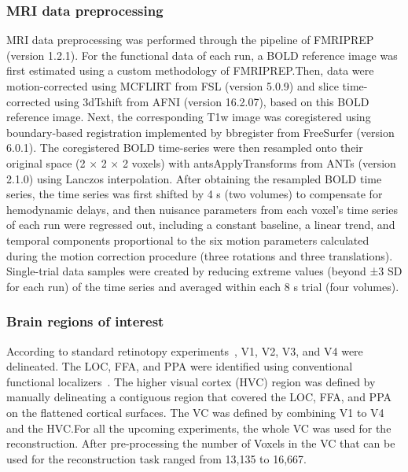 \subsubsection{MRI data preprocessing}
MRI data preprocessing was performed through the pipeline of FMRIPREP (version 1.2.1). For the functional data of each run, a BOLD reference image was first estimated using a custom methodology of FMRIPREP.\@ Then, data were motion-corrected using MCFLIRT from FSL (version 5.0.9) and slice time-corrected using 3dTshift from AFNI (version 16.2.07), based on this BOLD reference image. Next, the corresponding T1w image was coregistered using boundary-based registration implemented by bbregister from FreeSurfer (version 6.0.1). The coregistered BOLD time-series were then resampled onto their original space (2 $\times$ 2 $\times$ 2  voxels) with antsApplyTransforms from ANTs (version 2.1.0) using Lanczos interpolation. After obtaining the resampled BOLD time series, the time series was first shifted by 4 s (two volumes) to compensate for hemodynamic delays, and then nuisance parameters from each voxel’s time series of each run were regressed out, including a constant baseline, a linear trend, and temporal components proportional to the six motion parameters calculated during the motion correction procedure (three rotations and three translations). Single-trial data samples were created by reducing extreme values (beyond ±3 SD for each run) of the time series and averaged within each 8 s trial (four volumes).

\subsubsection{Brain regions of interest}
According to standard retinotopy experiments~\cite{engelFMRIHumanVisual1994,serenoBordersMultipleVisual1995}, V1, V2, V3, and V4 were delineated. The LOC, FFA, and PPA were identified using conventional functional localizers~\cite{kanwisherFusiformFaceArea1997,epsteinCorticalRepresentationLocal1998,kourtziCorticalRegionsInvolved2000}. The higher visual cortex (HVC) region was defined by manually delineating a contiguous region that covered the LOC, FFA, and PPA on the flattened cortical surfaces. The VC was defined by combining V1 to V4 and the HVC.\@ For all the upcoming experiments, the whole VC was used for the reconstruction. After pre-processing the number of Voxels in the VC that can be used for the reconstruction task ranged from 13,135 to 16,667.

